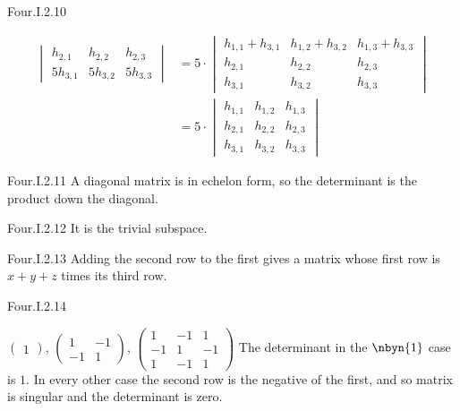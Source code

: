 \begin{ans}{Four.I.2.10}
\begin{exparts}
\begin{align*}
\begin{vmatrix}
            h_{2,1}          &h_{2,2}         &h_{2,3} \\
            5h_{3,1}         &5h_{3,2}        &5h_{3,3}
          \end{vmatrix}
          &=
          5\cdot
          \begin{vmatrix}
            h_{1,1}+h_{3,1}  &h_{1,2}+h_{3,2} &h_{1,3}+h_{3,3} \\
            h_{2,1}          &h_{2,2}         &h_{2,3} \\
            h_{3,1}          &h_{3,2}         &h_{3,3}
          \end{vmatrix}                                     \\
          &=5\cdot
          \begin{vmatrix}
            h_{1,1}          &h_{1,2}         &h_{1,3} \\
            h_{2,1}          &h_{2,2}         &h_{2,3} \\
            h_{3,1}          &h_{3,2}         &h_{3,3}
          \end{vmatrix}
          \end{align*}
      \end{exparts}
     
\end{ans}
\begin{ans}{Four.I.2.11}
       A diagonal matrix is in echelon form, so
       the determinant is the product down the diagonal.
    
\end{ans}
\begin{ans}{Four.I.2.12}
      It is the trivial subspace.
    
\end{ans}
\begin{ans}{Four.I.2.13}
      Adding the second row to the first gives a matrix whose first row
      is $x+y+z$ times its third row.
    
\end{ans}
\begin{ans}{Four.I.2.14}
      \begin{exparts}
        \partsitem
          $\begin{pmatrix}
            1
          \end{pmatrix}$,
          $\begin{pmatrix}
            1  &-1  \\
            -1  &1
          \end{pmatrix}$,
          $\begin{pmatrix}
            1   &-1  &1   \\
            -1  &1   &-1  \\
            1   &-1  &1
          \end{pmatrix}$
        \partsitem The determinant in the $\nbyn{1}$ case is $1$.
          In every other case the second row is the negative of the first,
          and so matrix is singular and the determinant is zero.
      \end{exparts}
    
\end{ans}
